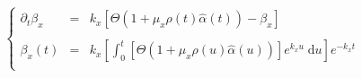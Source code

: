 \documentclass[aps,onecolumn,11pt]{revtex4}
\newcommand{\mychem}[1]{\mathtt{#1}}
\newcommand{\myconc}[1]{\left\lbrack{#1}\right\rbrack}
\newcommand{\spproton}{\mychem{H}}
\newcommand{\proton}{\myconc{\spproton}}
\begin{document}
\begin{equation}
\left\lbrace
\begin{array}{rcl}
	\partial_t \beta_x  & = & k_x \left[ \Theta\left( 1 + \mu_x \rho(t) \hat\alpha(t) \right)- \beta_x\right]\\
	\\
	\beta_x(t) & = & \displaystyle k_x\left[ \int_0^t \left[ \Theta\left( 1 + \mu_x \rho(u) \hat\alpha(u) \right) \right] e^{k_xu} \; \mathrm{d} u \right] e^{-k_x t}\\
\end{array}
\right.
\end{equation}

%
\end{document}
